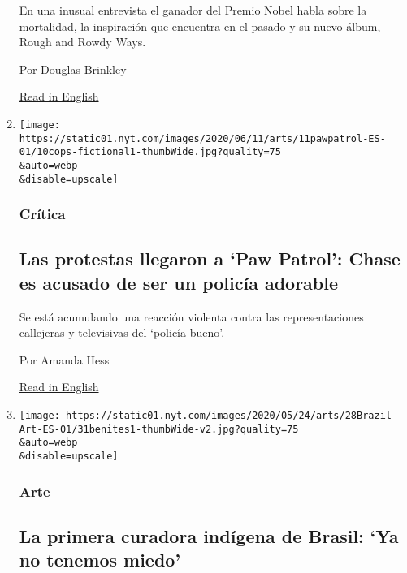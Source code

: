 \begin{enumerate}
  En una inusual entrevista el ganador del Premio Nobel habla sobre la
  mortalidad, la inspiración que encuentra en el pasado y su nuevo
  álbum, Rough and Rowdy Ways.

  Por Douglas Brinkley

  \href{https://www.nytimes.com/2020/06/12/arts/music/bob-dylan-rough-and-rowdy-ways.html}{Read
  in English}
\item
  \href{/es/2020/06/11/espanol/cultura/policias-television-paw-patrol-racismo.html}{}

  \texttt{[image: https://static01.nyt.com/images/2020/06/11/arts/11pawpatrol-ES-01/10cops-fictional1-thumbWide.jpg?quality=75\\\&auto=webp\\\&disable=upscale]}

  \hypertarget{cruxedtica}{%
  \subsubsection{Crítica}\label{cruxedtica}}

  \hypertarget{las-protestas-llegaron-a-paw-patrol-chase-es-acusado-de-ser-un-policuxeda-adorable}{%
  \subsection{Las protestas llegaron a `Paw Patrol': Chase es acusado de
  ser un policía
  adorable}\label{las-protestas-llegaron-a-paw-patrol-chase-es-acusado-de-ser-un-policuxeda-adorable}}

  Se está acumulando una reacción violenta contra las representaciones
  callejeras y televisivas del `policía bueno'.

  Por Amanda Hess

  \href{https://www.nytimes.com/2020/06/10/arts/television/protests-fictional-cops.html}{Read
  in English}
\item
  \href{/es/2020/05/28/espanol/cultura/arte-indigena-brasil-sandra-benites.html}{}

  \texttt{[image: https://static01.nyt.com/images/2020/05/24/arts/28Brazil-Art-ES-01/31benites1-thumbWide-v2.jpg?quality=75\\\&auto=webp\\\&disable=upscale]}

  \hypertarget{arte}{%
  \subsubsection{Arte}\label{arte}}

  \hypertarget{la-primera-curadora-induxedgena-de-brasil-ya-no-tenemos-miedo}{%
  \subsection{La primera curadora indígena de Brasil: `Ya no tenemos
  miedo'}\label{la-primera-curadora-induxedgena-de-brasil-ya-no-tenemos-miedo}}


\end{enumerate}
